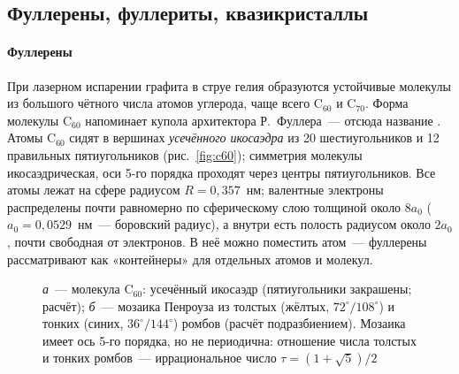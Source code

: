 \subsection{Фуллерены, фуллериты, квазикристаллы}\label{ssec:fullerenes}

\paragraph{Фуллерены}
При лазерном испарении графита в струе гелия образуются устойчивые
молекулы из большого чётного числа атомов углерода, чаще всего C$_{60}$ и
C$_{70}$. Форма молекулы C$_{60}$ напоминает купола архитектора Р.~Фуллера~—
отсюда название . Атомы C$_{60}$ сидят в вершинах
\emph{усечённого икосаэдра} из 20 шестиугольников и 12 правильных
пятиугольников (рис.~\ref{fig:c60}); симметрия молекулы икосаэдрическая,
оси 5-го порядка проходят через центры пятиугольников. Все атомы лежат на
сфере радиусом $R=0{,}357$~нм; валентные электроны распределены почти
равномерно по сферическому слою толщиной около $8a_0$ ($a_0=0{,}0529$~нм~—
боровский радиус), а внутри есть полость радиусом около $2a_0$, почти
свободная от электронов. В неё можно поместить атом~— фуллерены
рассматривают как «контейнеры» для отдельных атомов и молекул.

\begin{figure}[ht]
\centering
\begin{subfigure}[b]{0.42\textwidth}\centering
{}
\caption{}
\end{subfigure}\hfill
\begin{subfigure}[b]{0.52\textwidth}\centering
{}
\caption{}
\end{subfigure}
\caption{\textit{а}~— молекула C$_{60}$: усечённый икосаэдр (пятиугольники
закрашены; расчёт); \textit{б}~— мозаика Пенроуза из толстых (жёлтых,
$72^\circ/108^\circ$) и тонких (синих, $36^\circ/144^\circ$) ромбов (расчёт
подразбиением). Мозаика имеет ось 5-го порядка, но не периодична:
отношение числа толстых и тонких ромбов~— иррациональное число
$\tau=(1+\sqrt5)/2$}
\label{fig:c60}\label{fig:penrose}
\end{figure}

